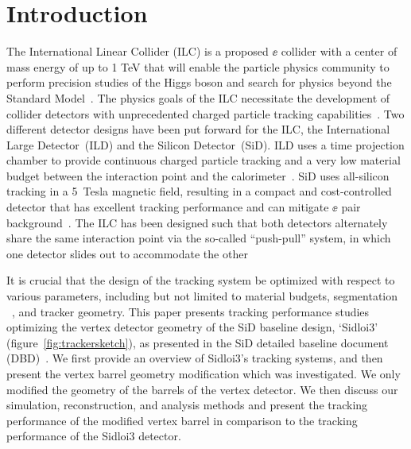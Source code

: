 \section{Introduction}
The International Linear Collider (ILC) is a proposed  
$\ee$ collider with a center of mass energy of up to 1 TeV
that will enable the particle physics community to perform 
precision studies of the Higgs boson
and search for physics beyond
 the Standard Model~\cite{Baer:2013cma}.
The  physics goals of the ILC
 necessitate the development of collider detectors with unprecedented 
charged particle tracking capabilities~\cite{Behnke:2013lya}.
Two different detector designs have been put forward
for the ILC, the International Large Detector~(ILD)
and the Silicon Detector~(SiD).
ILD uses a time projection chamber to provide
continuous charged particle tracking and a very low material budget
between the interaction point and the calorimeter~\cite{Behnke:2013lya}.
SiD uses all-silicon tracking in a 5~Tesla magnetic field,
resulting in a compact and cost-controlled detector
that has excellent tracking performance and 
can mitigate $\ee$ pair background~\cite{Behnke:2013lya}.
The ILC has been designed
such that both detectors
alternately share the same interaction point via
the so-called ``push-pull'' system, in which
one detector slides out to accommodate the other~\cite{Behnke:2013lya}

It is crucial that the design of the tracking system
be optimized with respect to various parameters,
including but not limited to material budgets,
segmentation ~\cite{2011arXiv1104.4547W},
and tracker geometry.
This paper presents tracking performance studies
 optimizing the vertex detector
geometry of the SiD baseline design,
`Sidloi3' (figure~\ref{fig:trackersketch}), as presented in the SiD
detailed baseline document (DBD)~\cite{Behnke:2013lya}.
We first provide an overview of Sidloi3's tracking systems,
and then present the vertex barrel geometry
modification which was investigated.
We only modified the geometry of the
barrels of the vertex detector.
We then discuss our simulation, 
 reconstruction, and analysis methods and present
the tracking performance of the modified vertex barrel in
comparison to the tracking performance of the
Sidloi3 detector.

